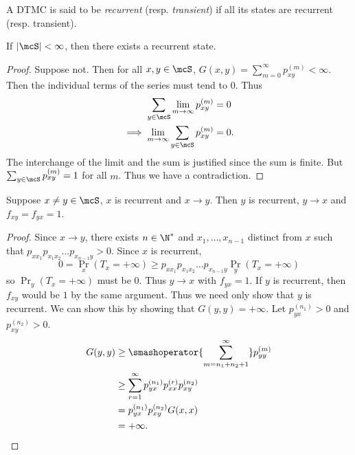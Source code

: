 \begin{definition*}
    A DTMC is said to be \emph{recurrent} (resp. \emph{transient}) if all
    its states are recurrent (resp. transient).
\end{definition*}

\begin{theorem*}
    If $\abs{\mcS} < \infty$, then there exists a recurrent state.
\end{theorem*}
\begin{proof}
    Suppose not.
    Then for all $x, y \in \mcS$, $G(x, y) = \sum_{m=0}^{\infty} p_{xy}^{(m)}
    < \infty$.
    Then the individual terms of the series must tend to $0$.
    Thus \begin{align*} %
        \sum_{y \in \mcS} \lim_{m \to \infty} p_{xy}^{(m)}
            &= 0 \\
        \implies \lim_{m \to \infty} \sum_{y \in \mcS} p_{xy}^{(m)}
            &= 0.
    \end{align*}
    The interchange of the limit and the sum is justified since the sum
    is finite.
    But $\sum_{y \in \mcS} p_{xy}^{(m)} = 1$ for all $m$. %
    Thus we have a contradiction.
\end{proof}

\begin{theorem*} \label{thm:tnr:neighbour}
    Suppose $x \ne y \in \mcS$, $x$ is recurrent and $x \to y$.
    Then $y$ is recurrent, $y \to x$ and $f_{xy} = f_{yx} = 1$.
\end{theorem*}
\begin{proof}
    Since $x \to y$, there exists $n \in \N^*$ and $x_1,\dots,x_{n-1}$
    distinct from $x$ such that $p_{xx_1}p_{x_1x_2}\dots p_{x_{n-1}y} > 0$.
    Since $x$ is recurrent, \[
        0 = \Pr_x(T_x = +\infty)
            \ge p_{xx_1}p_{x_1x_2}\dots p_{x_{n-1}y} \Pr_y(T_x = +\infty)
    \] so $\Pr_y(T_x = +\infty)$ must be $0$.
    Thus $y \to x$ with $f_{yx} = 1$.
    If $y$ is recurrent, then $f_{xy}$ would be $1$ by the same argument.
    Thus we need only show that $y$ is recurrent.
    We can show this by showing that $G(y, y) = +\infty$.
    Let $p_{yx}^{(n_1)} > 0$ and $p_{xy}^{(n_2)} > 0$.
    \begin{align*}
        G(y, y) &\ge \smashoperator{\sum_{m=n_1+n_2+1}^{\infty}}
                    p_{yy}^{(m)} \\
                &\ge \sum_{r=1}^{\infty} p_{yx}^{(n_1)}
                    p_{xx}^{(r)} p_{xy}^{(n_2)} \\
                &= p_{yx}^{(n_1)} p_{xy}^{(n_2)} G(x, x) \\
                &= +\infty. \qedhere
    \end{align*}
\end{proof}

